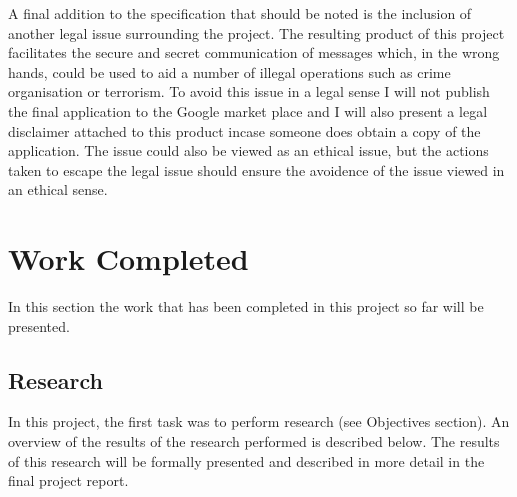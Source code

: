 \documentclass[a4paper,11pt]{article}
\begin{document}
A final addition to the specification that should be noted is the inclusion of another legal issue surrounding the project. The resulting product of this project facilitates the secure and secret communication of messages which, in the wrong hands, could be used to aid a number of illegal operations such as crime organisation or terrorism. To avoid this issue in a legal sense I will not publish the final application to the Google market place and I will also present a legal disclaimer attached to this product incase someone does obtain a copy of the application. The issue could also be viewed as an ethical issue, but the actions taken to escape the legal issue should ensure the avoidence of the issue viewed in an ethical sense. 

\section{Work Completed}

In this section the work that has been completed in this project so far will be presented.

\subsection{Research}

In this project, the first task was to perform research (see Objectives section). An overview of the results of the research performed is described below. The results of this research will be formally presented and described in more detail in the final project report.
\end{document}
